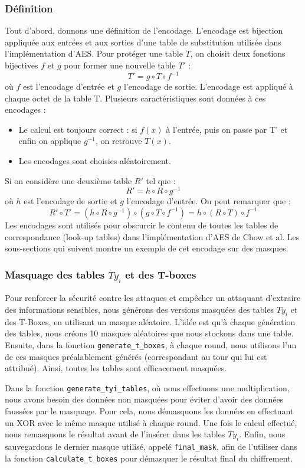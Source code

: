 \documentclass[a4paper, 10pt]{article}
\begin{document}
\subsubsection{Définition}
Tout d'abord, donnons une définition de l'encodage. L'encodage est bijection appliquée aux entrées et aux sorties 
d’une table de substitution utilisée dans l’implémentation d’AES. Pour protéger une table \(T\), on choisit deux fonctions bijectives 
\(f\) et \(g\) pour former une nouvelle table \(T'\) :
\[ T' = g \circ T \circ f^{-1}\]
où \(f\) est l'encodage d'entrée et \(g\) l'encodage de sortie.
L'encodage est appliqué à chaque octet de la table T. Plusieurs caractéristiques sont données à ces encodages :
\begin{itemize}
  \item Le calcul est toujours correct : si \(f(x)\) à l'entrée, puis on passe par T' et enfin on applique \(g^{-1}\), 
  on retrouve \(T(x)\).
  \item Les encodages sont choisies aléatoirement.
\end{itemize}
Si on considère une deuxième table \(R'\) tel que :
\[ R' = h \circ R \circ g^{-1}\]
où \(h\) est l'encodage de sortie et \(g\) l'encodage d'entrée. On peut remarquer que :
\[ R' \circ T' = (h \circ R \circ g^{-1}) \circ (g \circ T \circ f^{-1}) = h \circ (R \circ T) \circ f^{-1}\]
Les encodages sont utilisés pour obscurcir le contenu de toutes les tables de correspondance (look-up tables) 
dans l’implémentation d’AES de Chow et al. Les sous-sections qui suivent montre un exemple de cet encodage sur des masques.
\subsubsection{Masquage des tables $Ty_{i}$ et des T-boxes}
Pour renforcer la sécurité contre les attaques et empêcher un attaquant d'extraire des informations sensibles, 
nous générons des versions masquées des tables $Ty_{i}$ et des T-Boxes, en utilisant un masque aléatoire.
L'idée est qu'à chaque génération des tables, nous créons 10 masques aléatoires que nous stockons dans une table.
Ensuite, dans la fonction \texttt{generate\_t\_boxes}, à chaque round, nous utilisons l'un de ces masques préalablement générés 
(correspondant au tour qui lui est attribué). 
Ainsi, toutes les tables sont efficacement masquées.

Dans la fonction \texttt{generate\_tyi\_tables}, où nous effectuons une multiplication, nous avons besoin des données non masquées 
pour éviter d'avoir des données faussées par le masquage.
Pour cela, nous démasquons les données en effectuant un XOR avec le même masque utilisé à chaque round.
Une fois le calcul effectué, nous remasquons le résultat avant de l'insérer dans les tables $Ty_{i}$.
Enfin, nous sauvegardons le dernier masque utilisé, appelé \texttt{final\_mask}, afin de l'utiliser dans la fonction 
\texttt{calculate\_t\_boxes} pour démasquer le résultat final du chiffrement.
\end{document}
